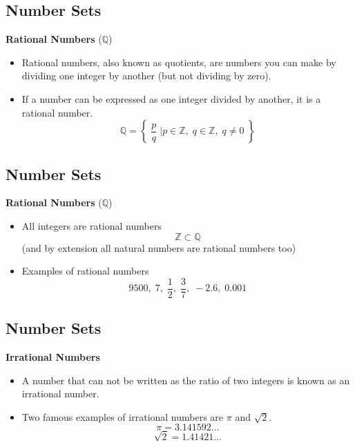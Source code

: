 \documentclass[]{report}
\begin{document}
\begin{enumerate}
\subsection{Number Sets}

\textbf{Rational Numbers} ($\mathbb{Q}$)
\begin{itemize}
\item Rational numbers, also known as quotients, are numbers you can make by dividing one integer by another (but not dividing by zero). 
\item If a number can be expressed as one integer divided by another, it is a rational number.
\[ \mathbb{Q} = \left\{\; \frac{p}{q} \;\bigg| p \in \mathbb{Z},\; q \in \mathbb{Z},\; q \neq 0  \;   \right\}   \]
\end{itemize}


\subsection{Number Sets}

\textbf{Rational Numbers} ($\mathbb{Q}$)
\begin{itemize}
\item All integers are rational numbers 
\[ \mathbb{Z}  \subset \mathbb{Q}\]
(and by extension all natural numbers are rational numbers too)
\item Examples of rational numbers
\[ 9500,\;7,\; \frac{1}{2} ,\; \frac{3}{7},\; -2.6 ,\; 0.001\] 
\end{itemize}


\subsection{Number Sets}

\textbf{Irrational Numbers} 
\begin{itemize}
\item A number that can not be written as the ratio of two integers is known as an irrational number.
\item Two famous examples of irrational numbers are $\pi$ and $\sqrt{2}$. 
\[\pi = 3.141592\ldots\]
\[\sqrt{2} = 1.41421\ldots\]
\end{itemize}



\end{enumerate}
\end{document}
